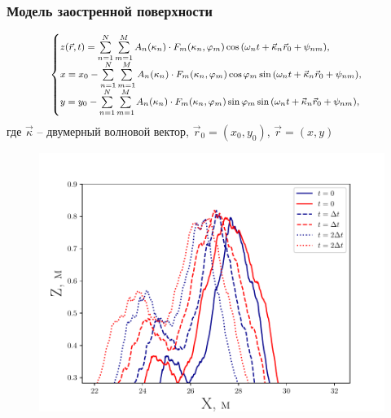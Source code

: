 \documentclass[10pt,pdf,hyperref={unicode}, dvipsnames]{beamer}
\renewcommand{\phi}{\varphi}
\begin{document}
\begin{frame}[t]
    \frametitle{Модель заостренной поверхности}
    \begin{equation}
        \footnotesize
        \begin{cases}
            \label{eq:surface2dcwm}
            z(\vec r,t) = \sum\limits_{n=1}^{N} \sum\limits_{m=1}^{M}
            A_n(\kappa_n) \cdot
            F_m(\kappa_n,\phi_m) \cos \qty(\omega_n t + \vec \kappa_n \vec r_0 +
            \psi_{nm}),    \\
            x = x_0 - \sum\limits_{n=1}^{N} \sum\limits_{m=1}^{M}
            A_n(\kappa_n) \cdot
            F_m(\kappa_n,\phi_m) \cos\phi_m \sin\qty(\omega_n t + \vec \kappa_n \vec r_0 +
            \psi_{nm}),\\
            y = y_{0} - \sum\limits_{n=1}^{N} \sum\limits_{m=1}^{M}
            A_n(\kappa_n) \cdot
            F_m(\kappa_n,\phi_m) \sin \phi_m \sin \qty(\omega_n t + \vec \kappa_n \vec
            r_0 + \psi_{nm}),
        \end{cases}
    \end{equation}
    где $\vec \kappa$ -- двумерный волновой вектор,  
    $\vec r_0 = (x_0, y_0)$, $\vec r = (x, y)$

    \begin{figure}
        \centering
        \includegraphics[height=0.5\textheight]{fig/evolution}
    \end{figure}

\end{frame}
\end{document}
